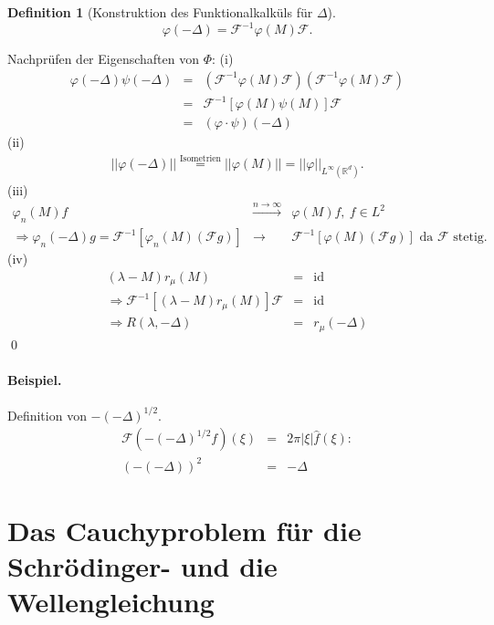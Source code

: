 \documentclass[12pt]{extreport} %
\newtheorem{Definition}[Satz]{Definition}
\DeclareMathOperator{\id}{id}
\numberwithin{equation}{section}
\newcommand{\R}{\mathbb{R}} %
\newcommand{\f}{\hat{f}}
\newcommand{\F}{\mathcal{F}}
\newcommand{\m}{\cdot}
\newcommand{\laplace}{\Delta}
\begin{document}
	\begin{Definition}[Konstruktion des Funktionalkalküls für $\laplace$]
		$$\varphi(-\laplace) = \F^{-1}\varphi(M)\F.$$
	\end{Definition}
	
	Nachprüfen der Eigenschaften von $\Phi$: (i)
	\begin{eqnarray}
		\varphi(-\laplace)\psi(-\laplace) &=& \left(\F^{-1}\varphi(M)\F \right)\left(\F^{-1}\varphi(M)\F \right)\nonumber\\
		&=&\F^{-1}[\varphi(M)\psi(M)]\F \nonumber\\
		&=& (\varphi\m \psi)(-\laplace)\nonumber
	\end{eqnarray}
	(ii)
	\begin{eqnarray}
		||\varphi(-\laplace)|| \overset{\text{Isometrien}}{=}||\varphi(M)|| =||\varphi||_{L^{\infty}(\R^d)}.\nonumber
	\end{eqnarray}
	(iii) 
	\begin{eqnarray}
		\varphi_n(M)f&\overset{n\rightarrow\infty}{\longrightarrow}&\varphi(M)f,~f\in L^2\nonumber\\
		\Rightarrow \varphi_n(-\laplace)g = \F^{-1}[\varphi_n(M)(\F g)]&\rightarrow &\F^{-1}[\varphi(M)(\F g)] \text{ da }\F\text{ stetig.}\nonumber
	\end{eqnarray}
	(iv)
	\begin{eqnarray}
		(\lambda-M)r_\mu(M)&=& \id\nonumber\\
		\Rightarrow \F^{-1}[(\lambda-M)r_\mu(M)]\F &=&\id\nonumber\\
		\Rightarrow R(\lambda,-\laplace) &=& r_\mu(-\laplace)\nonumber
	\end{eqnarray}
	\qed
	
	\paragraph{Beispiel.} Definition von $-(-\laplace)^{1/2}$.
	\begin{eqnarray}
		\F(-(-\laplace)^{1/2} f)(\xi) &=& 2\pi|\xi|\f(\xi):\nonumber\\
		(-(-\laplace))^2 &=& -\laplace\nonumber
	\end{eqnarray}
	
	\newpage
	
	\section{Das Cauchyproblem für die Schrödinger- und die Wellengleichung}
	
\end{document}
